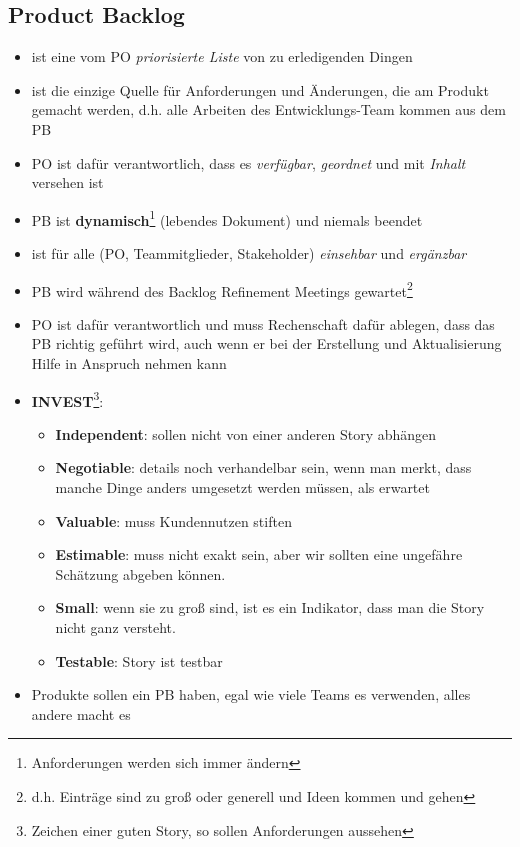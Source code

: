 \subsection{Product Backlog}
\begin{itemize}
  \item ist eine vom PO \textit{priorisierte Liste} von zu erledigenden Dingen
  \item ist die einzige Quelle für Anforderungen und Änderungen, die am Produkt gemacht werden,
    d.h. alle Arbeiten des Entwicklungs-Team kommen aus dem PB
  \item PO ist dafür verantwortlich, dass es \textit{verfügbar}, \textit{geordnet} und mit
    \textit{Inhalt} versehen ist
  \item PB ist \textbf{dynamisch}\footnote{Anforderungen werden sich immer ändern} (lebendes Dokument) und niemals beendet
  \item ist für alle (PO, Teammitglieder, Stakeholder) \textit{einsehbar} und \textit{ergänzbar}
  \item PB wird während des Backlog Refinement Meetings gewartet\footnote{d.h. Einträge sind zu groß
      oder generell und Ideen kommen und gehen}
  \item PO ist dafür verantwortlich und muss Rechenschaft dafür ablegen, dass das PB richtig
    geführt wird, auch wenn er bei der Erstellung und Aktualisierung Hilfe in Anspruch nehmen kann
  \item \textbf{INVEST}\footnote{Zeichen einer guten Story, so sollen Anforderungen aussehen}:
    \begin{itemize}
      \item \textbf{Independent}: sollen nicht von einer anderen Story abhängen
      \item \textbf{Negotiable}: details noch verhandelbar sein, wenn man merkt, dass
        manche Dinge anders umgesetzt werden müssen, als erwartet
      \item \textbf{Valuable}: muss Kundennutzen stiften
      \item \textbf{Estimable}: muss nicht exakt sein, aber wir sollten eine ungefähre Schätzung
        abgeben können.
      \item \textbf{Small}: wenn sie zu groß sind, ist es ein Indikator, dass man die Story nicht
        ganz versteht.
      \item \textbf{Testable}: Story ist testbar
    \end{itemize}
  \item Produkte sollen ein PB haben, egal wie viele Teams es verwenden, alles andere macht es

\end{itemize}
